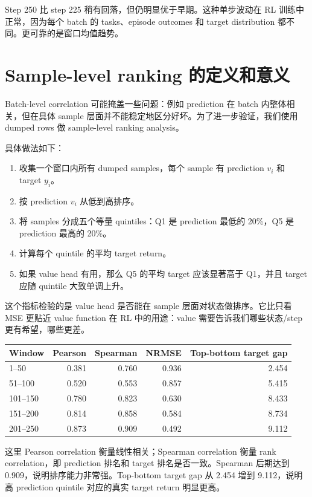 \documentclass[10pt]{ctexart}
\begin{document}
Step 250 比 step 225 稍有回落，但仍明显优于早期。这种单步波动在 RL 训练中正常，因为每个 batch 的 tasks、episode outcomes 和 target distribution 都不同。更可靠的是窗口均值趋势。

\section{Sample-level ranking 的定义和意义}
Batch-level correlation 可能掩盖一些问题：例如 prediction 在 batch 内整体相关，但在具体 sample 层面并不能稳定地区分好坏。为了进一步验证，我们使用 dumped rows 做 sample-level ranking analysis。

具体做法如下：
\begin{enumerate}
  \item 收集一个窗口内所有 dumped samples，每个 sample 有 prediction $v_i$ 和 target $y_i$。
  \item 按 prediction $v_i$ 从低到高排序。
  \item 将 samples 分成五个等量 quintiles：Q1 是 prediction 最低的 20\%，Q5 是 prediction 最高的 20\%。
  \item 计算每个 quintile 的平均 target return。
  \item 如果 value head 有用，那么 Q5 的平均 target 应该显著高于 Q1，并且 target 应随 quintile 大致单调上升。
\end{enumerate}

这个指标检验的是 value head 是否能在 sample 层面对状态做排序。它比只看 MSE 更贴近 value function 在 RL 中的用途：value 需要告诉我们哪些状态/step 更有希望，哪些更差。

\begin{center}
\begin{tabular}{lrrrr}
\toprule
Window & Pearson & Spearman & NRMSE & Top-bottom target gap \\
\midrule
1--50 & 0.381 & 0.760 & 0.936 & 2.454 \\
51--100 & 0.520 & 0.553 & 0.857 & 5.415 \\
101--150 & 0.780 & 0.823 & 0.630 & 8.433 \\
151--200 & 0.814 & 0.858 & 0.584 & 8.734 \\
201--250 & 0.873 & 0.909 & 0.492 & 9.112 \\
\bottomrule
\end{tabular}
\end{center}

这里 Pearson correlation 衡量线性相关；Spearman correlation 衡量 rank correlation，即 prediction 排名和 target 排名是否一致。Spearman 后期达到 0.909，说明排序能力非常强。Top-bottom target gap 从 2.454 增到 9.112，说明高 prediction quintile 对应的真实 target return 明显更高。
\end{document}
